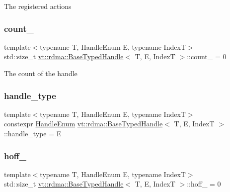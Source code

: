 The registered actions \mbox{\label{structvt_1_1rdma_1_1_base_typed_handle_ac474123342ec5f8f82d2346b09331fc4}} 
\subsubsection{\texorpdfstring{count\+\_\+}{count\_}}
{\footnotesize\ttfamily template$<$typename T, Handle\+Enum E, typename IndexT$>$ \\
std\+::size\+\_\+t \hyperlink{structvt_1_1rdma_1_1_base_typed_handle}{vt\+::rdma\+::\+Base\+Typed\+Handle}$<$ T, E, IndexT $>$\+::count\+\_\+ = 0\hspace{0.3cm}{\ttfamily [protected]}}

The count of the handle \mbox{\label{structvt_1_1rdma_1_1_base_typed_handle_afdff2a8569424f4b9be14ac0f2daf5ca}} 
\subsubsection{\texorpdfstring{handle\+\_\+type}{handle\_type}}
{\footnotesize\ttfamily template$<$typename T, Handle\+Enum E, typename IndexT$>$ \\
constexpr \hyperlink{namespacevt_1_1rdma_a0234ff19cfb3c04718cfdfd36b2d6d88}{Handle\+Enum} \hyperlink{structvt_1_1rdma_1_1_base_typed_handle}{vt\+::rdma\+::\+Base\+Typed\+Handle}$<$ T, E, IndexT $>$\+::handle\+\_\+type = E\hspace{0.3cm}{\ttfamily [static]}}

\mbox{\label{structvt_1_1rdma_1_1_base_typed_handle_a009a2f6951b5a3284f1f19bb9b56e4e2}} 
\subsubsection{\texorpdfstring{hoff\+\_\+}{hoff\_}}
{\footnotesize\ttfamily template$<$typename T, Handle\+Enum E, typename IndexT$>$ \\
std\+::size\+\_\+t \hyperlink{structvt_1_1rdma_1_1_base_typed_handle}{vt\+::rdma\+::\+Base\+Typed\+Handle}$<$ T, E, IndexT $>$\+::hoff\+\_\+ = 0\hspace{0.3cm}{\ttfamily [protected]}}

